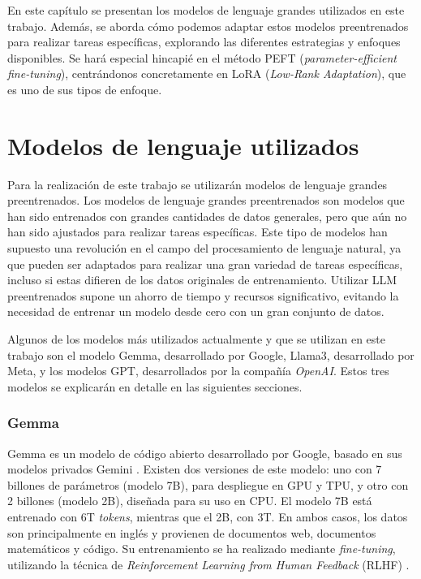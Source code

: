 \documentclass[11pt,spanish,listoffigures,listoftables]{tfgetsinf}
\begin{document}
En este capítulo se presentan los modelos de lenguaje grandes utilizados en este trabajo. Además, se aborda cómo podemos adaptar estos modelos preentrenados para realizar tareas  específicas, explorando las diferentes estrategias y enfoques disponibles. Se hará especial hincapié en el método PEFT  (\textit{parameter-efficient fine-tuning}), centrándonos concretamente en LoRA (\textit{Low-Rank Adaptation}), que es uno de sus tipos de enfoque.

\section{Modelos de lenguaje utilizados} \label{modelosUtilizados}

Para la realización de este trabajo se utilizarán modelos de lenguaje grandes preentrenados. Los modelos de lenguaje grandes preentrenados son modelos que han sido entrenados con grandes cantidades de datos generales, pero que aún no han sido ajustados para realizar tareas específicas. Este tipo de modelos han supuesto una revolución en el campo del procesamiento de lenguaje natural, ya que pueden ser adaptados para realizar una gran variedad de tareas específicas, incluso si estas difieren de los datos originales de entrenamiento. Utilizar LLM preentrenados supone un ahorro de tiempo y recursos significativo, evitando la necesidad de entrenar un modelo desde cero con un gran conjunto de datos.

Algunos de los modelos más utilizados actualmente y que se utilizan en este trabajo son el modelo Gemma, desarrollado por Google, Llama3, desarrollado por Meta, y los modelos GPT, desarrollados por la compañía \textit{OpenAI}. Estos tres modelos se explicarán en detalle en las siguientes secciones.

\subsubsection{Gemma}

Gemma \cite{gemmateam2024gemmaopenmodelsbased} es un modelo de código abierto desarrollado por Google, basado en sus modelos privados Gemini \cite{geminiteam2024geminifamilyhighlycapable}. Existen dos versiones de este modelo: uno con 7 billones de parámetros (modelo 7B), para despliegue en GPU y TPU, y otro con 2 billones (modelo 2B), diseñada para su uso en CPU. El modelo 7B está entrenado con 6T \textit {tokens}, mientras que el 2B, con 3T. En ambos casos, los datos son principalmente en inglés y provienen de documentos web, documentos matemáticos y código. Su entrenamiento se ha realizado mediante \textit{fine-tuning}, utilizando la técnica de  \textit{Reinforcement Learning from Human Feedback} (RLHF) \cite{christiano2023deepreinforcementlearninghuman}.
\end{document}
